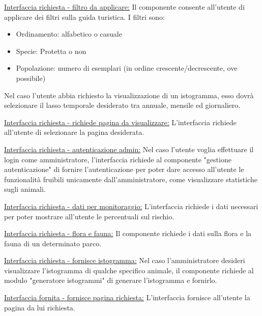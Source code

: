 \vspace{5mm}
\noindent
\underline{Interfaccia richiesta - filtro da applicare:}
Il componente consente all'utente di applicare dei filtri sulla guida turistica. I filtri sono:
\begin{itemize}
    \item Ordinamento: alfabetico o casuale
    \item Specie: Protetta o non
    \item Popolazione: numero di esemplari (in ordine crescente/decrescente, ove possibile)
\end{itemize}

Nel caso l'utente abbia richiesto la visualizzazione di un istogramma, esso dovrà selezionare il lasso temporale desiderato tra annuale, mensile ed giornaliero.


\vspace{5mm}
\noindent
\underline{Interfaccia richiesta - richiede pagina da visualizzare:} L'interfaccia richiede all'utente di selezionare la pagina desiderata.

\vspace{5mm}
\noindent
\underline{Interfaccia richiesta - autenticazione admin:}
Nel caso l'utente voglia effettuare il login come amministratore, l'interfaccia richiede al componente "gestione autenticazione" di fornire l'autenticazione per poter dare accesso all'utente le funzionalità fruibili unicamente dall'amministratore, come visualizzare statistiche sugli animali.

\vspace{5mm}
\noindent
\underline{Interfaccia richiesta - dati per monitoraggio:}
L'interfaccia richiede i dati necessari per poter mostrare all'utente le percentuali sul rischio.

\vspace{5mm}
\noindent
\underline{Interfaccia richiesta - flora e fauna:}
Il componente richiede i dati sulla flora e la fauna di un determinato parco.

\vspace{5mm}
\noindent
\underline{Interfaccia richiesta - fornisce istogramma:} 
Nel caso l'amministratore desideri visualizzare l'istogramma di qualche specifico animale, il componente richiede al modulo "generatore istogrammi" di generare l'istogramma e fornirlo.

\vspace{5mm}
\noindent
\underline{Interfaccia fornita - fornisce pagina richiesta:} L'interfaccia fornisce all'utente la pagina da lui richiesta.

